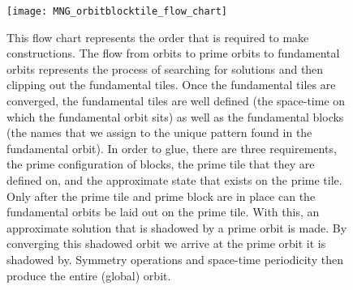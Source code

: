 \begin{description}
\begin{figure}
\begin{minipage}[height=.05\textheight]{.5\textwidth}
\centering
\texttt{[image: MNG\_orbitblocktile\_flow\_chart]}
\end{minipage}
\caption{ \label{fig:MNG_flowchart}
This flow chart represents the order that is required to make
{\spt} constructions. The flow from orbits to prime orbits to fundamental
orbits represents the process of searching for solutions and then clipping
out the fundamental tiles. Once the fundamental tiles are converged, the
fundamental tiles are well defined (the space-time on which the fundamental
orbit sits) as well as the fundamental blocks (the names that we assign
to the unique pattern found in the fundamental orbit). In order to glue,
there are three requirements, the prime configuration of blocks, the
prime tile that they are defined on, and the
approximate state that exists on the prime tile. Only after the prime
tile and prime block are in place can the fundamental orbits be
laid out on the prime tile. With this, an approximate solution that is
shadowed by a prime orbit is made. By converging this shadowed orbit
we arrive at the prime orbit it is shadowed by. Symmetry operations and
space-time periodicity then produce the entire (global) orbit.
}
\end{figure}

\end{description}

